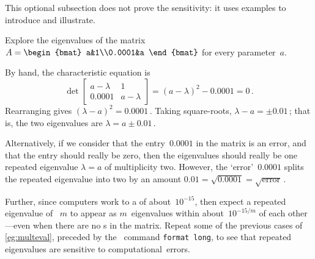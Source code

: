 This optional subsection does not prove the sensitivity: it uses examples to introduce and illustrate.


\begin{example} 
Explore the eigenvalues of the matrix
\(A=\begin{bmat} a&1\\0.0001&a \end{bmat}\) for every parameter~\(a\).
\begin{solution} 
By hand, the characteristic equation is
\begin{equation*}
\det\begin{bmatrix} a-\lambda&1\\0.0001&a-\lambda \end{bmatrix}
=(a-\lambda)^2-0.0001=0\,.
\end{equation*}
Rearranging gives \((\lambda-a)^2=0.0001\)\,.
Taking square-roots, \(\lambda-a=\pm0.01\)\,; that is, the two eigenvalues are \(\lambda=a\pm0.01\)\,.

Alternatively, if we consider that the entry~\(0.0001\) in the matrix is an error, and that the entry should really be zero, then the eigenvalues should really be one repeated eigenvalue \(\lambda=a\) of multiplicity two.
However, the `error'~\(0.0001\) splits the repeated eigenvalue into two by an amount \(0.01=\sqrt{0.0001}=\sqrt{\text{error}}\)\,.
\end{solution}
\end{example}


Further, since computers work to a  of about~\(10^{-15}\), then expect a repeated eigenvalue of ~\(m\) to appear as \(m\)~eigenvalues within about~\(10^{-15/m}\) of each other---even when there are no s in the matrix.
Repeat some of the previous cases of \cref{eg:multeval}, preceded by the \script\ command \verb|format long|, to see that repeated eigenvalues are sensitive to computational~errors.



